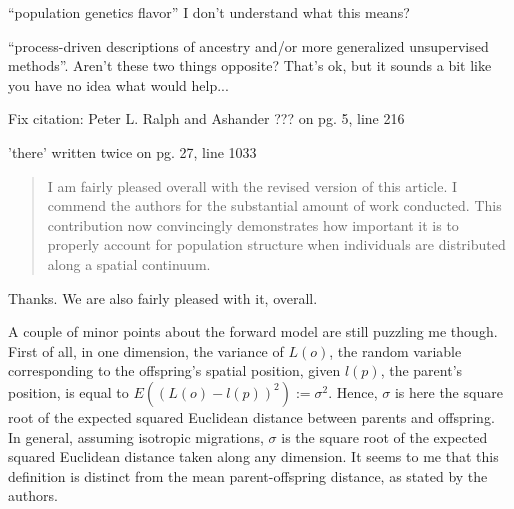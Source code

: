 \begin{point}{``population genetics flavor'' \revref}
I don't understand what this means?
\end{point}


\begin{point}{\revref}
``process-driven descriptions of ancestry and/or more generalized unsupervised methods''. Aren't these two things opposite? That's ok, but it sounds a bit like you have no idea what would help...
\end{point}



\begin{point}{}
 Fix citation: Peter L. Ralph and Ashander ??? on pg. 5, line 216
\end{point}


\begin{point}{}
'there' written twice on pg. 27, line 1033
\end{point}







\begin{quote}
I am fairly pleased overall with the revised version of this article. I commend the authors for the substantial amount of work conducted. This contribution now convincingly demonstrates how important it is to properly account for population structure when individuals are distributed along a spatial continuum.
\end{quote}

Thanks. We are also fairly pleased with it, overall.

\begin{point}{}
A couple of minor points about the forward model are still puzzling me though. First of all, in one dimension, the variance of $L(o)$, the random variable corresponding to the offspring's spatial position, given $l(p)$, the parent's position, is equal to $E((L(o)-l(p))^2):=\sigma^2$. Hence, $\sigma$ is here the square root of the expected squared Euclidean distance between parents and offspring. In general, assuming isotropic migrations, $\sigma$ is the square root of the expected squared Euclidean distance taken along any dimension. It seems to me that this definition is distinct from the mean parent-offspring distance, as stated by the authors.
\end{point}

